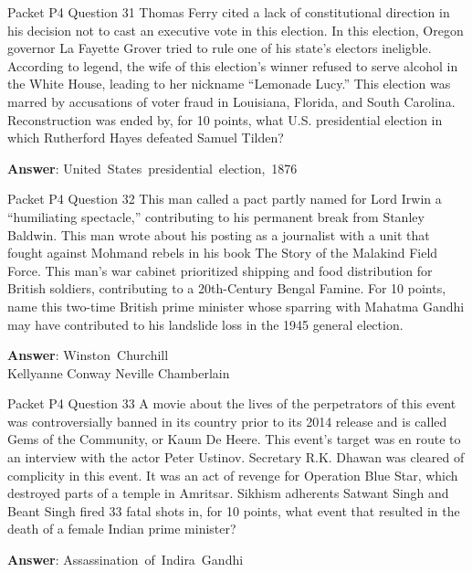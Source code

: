 \begin{frame}{Packet P4 Question 31}
Thomas Ferry cited a lack of constitutional direction in his decision not to cast an executive vote in this election. In this   election, Oregon governor La Fayette   Grover tried to rule one of his state's electors ineligble. According to legend, the wife of this election's winner refused to serve alcohol in the White House, leading to her nickname ``Lemonade Lucy.'' This election was marred by accusations of voter fraud in   Louisiana, Florida, and South Carolina. Reconstruction was   ended by, for 10 points, what U.S. presidential election in which Rutherford Hayes defeated Samuel Tilden?

\textbf{Answer}: United\ States\ presidential\ election,\ 1876\\
\end{frame}

\begin{frame}{Packet P4 Question 32}
This man called a pact   partly named for Lord Irwin a ``humiliating spectacle,'' contributing to his permanent break from Stanley Baldwin. This man wrote about his posting as a journalist with a unit that fought against Mohmand rebels in his book The Story of the Malakind Field Force. This man's war cabinet   prioritized shipping and food distribution   for British soldiers, contributing to a 20th-Century Bengal Famine. For 10 points, name this two-time British prime minister whose sparring with Mahatma Gandhi may have contributed to his landslide loss in the 1945 general election.  

\textbf{Answer}: Winston\ Churchill\\
 Kellyanne Conway
 Neville Chamberlain
\end{frame}

\begin{frame}{Packet P4 Question 33}
A movie about the lives of the perpetrators of this event was controversially banned in its country prior to its 2014 release and is called Gems of the Community, or Kaum De Heere. This event's target was en route to an interview with the actor Peter Ustinov. Secretary R.K. Dhawan was cleared of complicity in this event. It was an act of revenge for Operation Blue Star, which destroyed parts of a temple in Amritsar. Sikhism     adherents Satwant Singh and Beant   Singh fired 33 fatal   shots in, for 10 points, what event that resulted in the death of a female Indian prime minister?

\textbf{Answer}: Assassination\ of\ Indira\ Gandhi\\
\end{frame}

